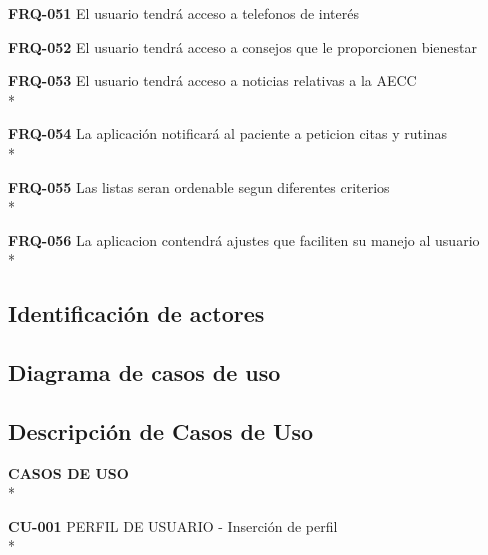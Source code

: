 \documentclass[../pfc.tex]{subfiles}
\begin{document}
	\textbf{FRQ-051}	El usuario tendrá acceso a telefonos de interés
	
	\textbf{FRQ-052}	El usuario tendrá acceso a consejos que le proporcionen bienestar
	
	\textbf{FRQ-053}	El usuario tendrá acceso a noticias relativas a la AECC\\*
	
	\textbf{FRQ-054}	La aplicación notificará al paciente a peticion citas y rutinas\\*
	
	\textbf{FRQ-055}	Las listas seran ordenable segun diferentes criterios\\*
	
	\textbf{FRQ-056}	La aplicacion contendrá ajustes que faciliten su manejo al usuario\\*
	
		

	\subsection{Identificación de actores}
		
	\subsection{Diagrama de casos de uso }
		



	\subsection{Descripción de Casos de Uso}
	
	\textbf{CASOS DE USO}\\*
	
		
	\textbf{CU-001} PERFIL DE USUARIO - Inserción de perfil\\*
	
\end{document}
